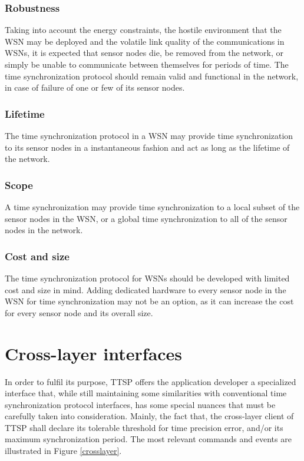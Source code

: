 \subsubsection{Robustness}
Taking into account the energy constraints, the hostile environment that the WSN may be deployed and the volatile link quality of the communications in WSNs, it is expected that sensor nodes die, be removed from the network, or simply be unable to communicate between themselves for periods of time. The time synchronization protocol should remain valid and functional in the network, in case of failure of one or few of its sensor nodes. 

\subsubsection{Lifetime}
The time synchronization protocol in a WSN may provide time synchronization to its sensor nodes in a instantaneous fashion and act as long as the lifetime of the network.

\subsubsection{Scope}
A time synchronization may provide time synchronization to a local subset of the sensor nodes in the WSN, or a global time synchronization to all of the sensor nodes in the network.

\subsubsection{Cost and size}
The time synchronization protocol for WSNs should be developed with limited cost and size in mind. Adding dedicated hardware to every sensor node in the WSN for time synchronization may not be an option, as it can increase the cost for every sensor node and its overall size.

\section{Cross-layer interfaces}
In order to fulfil its purpose, TTSP offers the application developer a specialized interface that, while still maintaining some similarities with conventional time synchronization protocol interfaces, has some special nuances that must be carefully taken into consideration. Mainly, the fact that, the cross-layer client of TTSP shall declare its tolerable threshold for time precision error, and/or its maximum synchronization period. The most relevant commands and events are illustrated in Figure \ref{crosslayer}.

